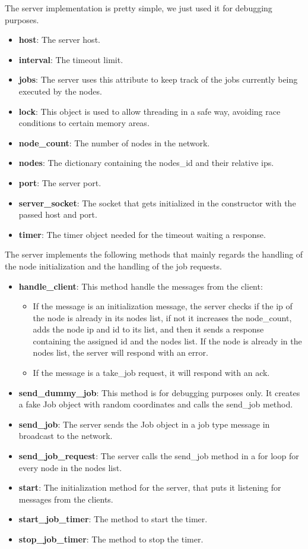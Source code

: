 \documentclass[titlepage]{article}
\begin{document}
The server implementation is pretty simple, we just used it for debugging purposes.

\begin{itemize}
    \item \textbf{host}: The server host.
    \item \textbf{interval}: The timeout limit.
    \item \textbf{jobs}: The server uses this attribute to keep track of the jobs currently being executed by the nodes.
    \item \textbf{lock}: This object is used to allow threading in a safe way, avoiding race conditions to certain memory areas.
    \item \textbf{node\_count}: The number of nodes in the network.
    \item \textbf{nodes}: The dictionary containing the nodes\_id and their relative ips.
    \item \textbf{port}: The server port.
    \item \textbf{server\_socket}: The socket that gets initialized in the constructor with the passed host and port.
    \item \textbf{timer}: The timer object needed for the timeout waiting a response.
\end{itemize}

The server implements the following methods that mainly regards the handling of the node initialization and the handling of the job requests.

\begin{itemize}
    \item \textbf{handle\_client}: This method handle the messages from the client:
    \begin{itemize}
        \item If the message is an initialization message, the server checks if the ip of the node is already in its nodes list, if not it increases the node\_count, adds the node ip and id to its list, and then it sends a response containing the assigned id and the nodes list. If the node is already in the nodes list, the server will respond with an error.
        \item If the message is a take\_job request, it will respond with an ack.
    \end{itemize}
    \item \textbf{send\_dummy\_job}: This method is for debugging purposes only. It creates a fake Job object with random coordinates and calls the send\_job method.
    \item \textbf{send\_job}: The server sends the Job object in a job type message in broadcast to the network.
    \item \textbf{send\_job\_request}: The server calls the send\_job method in a for loop for every node in the nodes list.
    \item \textbf{start}: The initialization method for the server, that puts it listening for messages from the clients.
    \item \textbf{start\_job\_timer}: The method to start the timer.
    \item \textbf{stop\_job\_timer}: The method to stop the timer.
\end{itemize}
\end{document}
